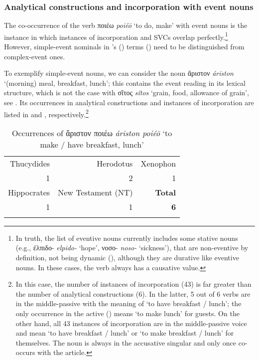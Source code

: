 \documentclass[output=paper,colorlinks,citecolor=brown]{langscibook}
\begin{document}
\subsubsection{Analytical constructions and incorporation with event nouns}\label{Section3/2/2}
The co-occurrence of the verb ποιέω \textit{poiéō} `to do, make' with event nouns is the instance in which instances of incorporation and SVCs overlap perfectly.\footnote{In truth, the list of eventive nouns currently includes some stative nouns (e.g., ἐλπιδο- \textit{elpido-} `hope', νοσο- \textit{noso-} `sickness'), that are non-eventive by definition, not being dynamic (), although they are durative like eventive nouns. In these cases, the verb always has a causative value.} However, simple-event nominals in \citeauthor{Grimshaw1990}'s (\citeyear{Grimshaw1990}) terms () need to be distinguished from complex-event ones.

To exemplify simple-event nouns, we can consider the noun ἄριστον \textit{áriston} `(morning) meal, breakfast, lunch'; this contains the event reading in its lexical structure, which is not the case with σῖτος \textit{sîtos} `grain, food, allowance of grain', see . Its occurrences in analytical constructions and instances of incorporation are listed in  and , respectively.\footnote{In this case, the number of instances of incorporation (43) is far greater than the number of analytical constructions (6). In the latter, 5 out of 6 verbs are in the middle-passive with the meaning of `to have breakfast / lunch'; the only occurrence in the active () means `to make lunch' for guests. On the other hand, all 43 instances of incorporation are in the middle-passive voice and mean `to have breakfast / lunch' or `to make breakfast / lunch' for themselves. The noun is always in the accusative singular and only once co-occurs with the article.}

\begin{table}[h]
	\caption{Occurrences of ἄριστον ποιέω \textit{áriston poiéō} `to make / have breakfast, lunch'}
	\label{tab:G:occurrences-ariston-poieo}
	\begin{tabular}{rrr}
    \lsptoprule
		Thucydides & Herodotus & Xenophon \\
		1   & 2    & 1   \\
        Hippocrates & New Testament (NT) & \textbf{Total} \\
        1   & 1   & \textbf{6} \\
    \lspbottomrule
	\end{tabular}
\end{table}
\end{document}
